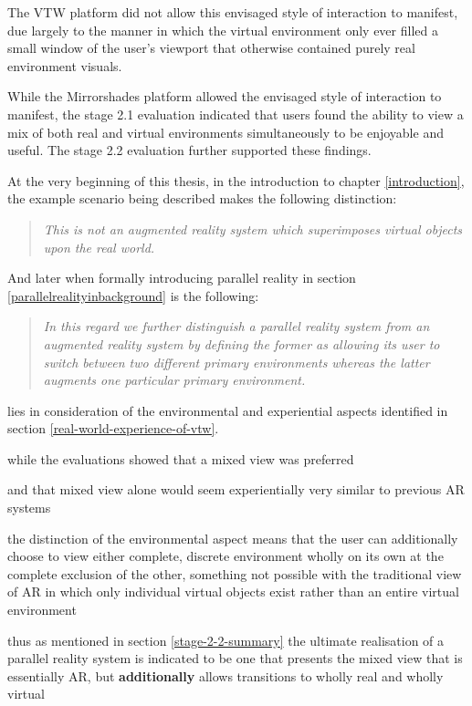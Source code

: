 The VTW platform did not allow this envisaged style of interaction to manifest, due largely to the manner in which the virtual environment only ever filled a small window of the user's viewport that otherwise contained purely real environment visuals.

While the Mirrorshades platform allowed the envisaged style of interaction to manifest, the stage 2.1 evaluation indicated that users found the ability to view a mix of both real and virtual environments simultaneously to be enjoyable and useful. The stage 2.2 evaluation further supported these findings.


At the very beginning of this thesis, in the introduction to chapter \ref{introduction}, the example scenario being described makes the following distinction:

\begin{quote}
	\textit{This is not an augmented reality system which superimposes virtual objects upon the real world.}
\end{quote}

And later when formally introducing parallel reality in section \ref{parallelrealityinbackground} is the following:

\begin{quote}
	\textit{In this regard we further distinguish a parallel reality system from an augmented reality system by defining the former as allowing its user to switch between two different primary environments whereas the latter augments one particular primary environment.}
\end{quote}

lies in consideration of the environmental and experiential aspects identified in section \ref{real-world-experience-of-vtw}.

while the evaluations showed that a mixed view was preferred

and that mixed view alone would seem experientially very similar to previous AR systems

the distinction of the environmental aspect means that the user can additionally choose to view either complete, discrete environment wholly on its own at the complete exclusion of the other, something not possible with the traditional view of AR in which only individual virtual objects exist rather than an entire virtual environment


thus as mentioned in section \ref{stage-2-2-summary} the ultimate realisation of a parallel reality system is indicated to be one that presents the mixed view that is essentially AR, but \textbf{additionally} allows transitions to wholly real and wholly virtual

